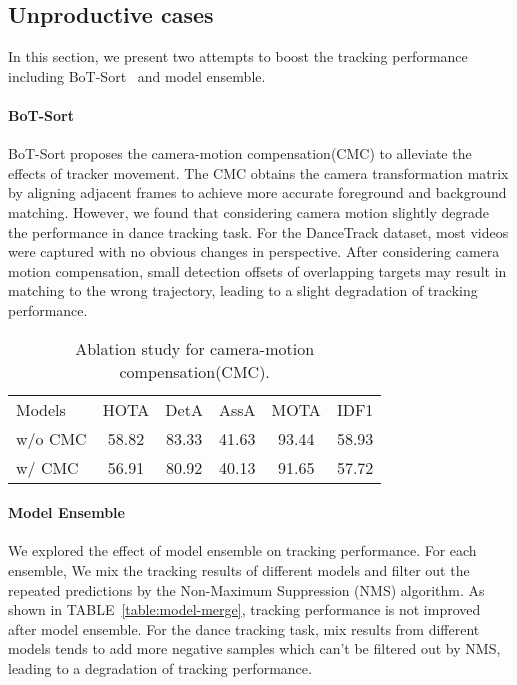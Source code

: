 \documentclass[10pt,twocolumn,letterpaper]{article}
\begin{document}
\subsection{Unproductive cases}

In this section, we present two attempts to boost the tracking performance including BoT-Sort~\cite{aharon2022bot} and model ensemble.

\paragraph{BoT-Sort} BoT-Sort proposes the camera-motion compensation(CMC) to alleviate the effects of tracker movement. The CMC obtains the camera transformation matrix by aligning adjacent frames to achieve more accurate foreground and background matching. However, we found that considering camera motion slightly degrade the performance in dance tracking task. For the DanceTrack dataset, most videos were captured with no obvious changes in perspective. After considering camera motion compensation, small detection offsets of overlapping targets may result in matching to the wrong trajectory, leading to a slight degradation of tracking performance.


\setlength{\tabcolsep}{4pt}
\begin{table}
\begin{center}
\caption{Ablation study for camera-motion compensation(CMC).}
\label{table:bot-sort}
\begin{tabular}{lccccc}
\hline\noalign{\smallskip}
Models & HOTA & DetA & AssA & MOTA & IDF1 \\
\noalign{\smallskip}
\hline
\noalign{\smallskip}
w/o CMC & 58.82 & 83.33 & 41.63 & 93.44 & 58.93\\
w/ CMC & 56.91 & 80.92 & 40.13 & 91.65 & 57.72\\
\hline
\end{tabular}
\end{center}
\end{table}
\setlength{\tabcolsep}{1.4pt}

\paragraph{Model Ensemble} We explored the effect of model ensemble on tracking performance. For each ensemble, We mix the tracking results of different models and filter out the repeated predictions by the Non-Maximum Suppression (NMS) algorithm. As shown in TABLE~\ref{table:model-merge}, tracking performance is not improved after model ensemble. For the dance tracking task, mix results from different models tends to add more negative samples which can't be filtered out by NMS, leading to a degradation of tracking performance.
\end{document}
